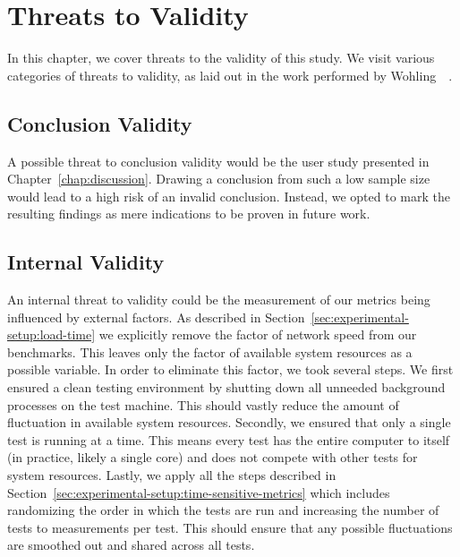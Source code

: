 \chapter{Threats to Validity}\label{chap:threats-to-validity}

In this chapter, we cover threats to the validity of this study. We visit various categories of threats to validity, as laid out in the work performed by Wohling~\etal{}~\cite{alma9939160411205131}.

\section{Conclusion Validity}
A possible threat to conclusion validity would be the user study presented in Chapter~\ref{chap:discussion}. Drawing a conclusion from such a low sample size would lead to a high risk of an invalid conclusion. Instead, we opted to mark the resulting findings as mere indications to be proven in future work.

\section{Internal Validity}
An internal threat to validity could be the measurement of our metrics being influenced by external factors. As described in Section~\ref{sec:experimental-setup:load-time} we explicitly remove the factor of network speed from our benchmarks. This leaves only the factor of available system resources as a possible variable. In order to eliminate this factor, we took several steps. We first ensured a clean testing environment by shutting down all unneeded background processes on the test machine. This should vastly reduce the amount of fluctuation in available system resources. Secondly, we ensured that only a single test is running at a time. This means every test has the entire computer to itself (in practice, likely a single core) and does not compete with other tests for system resources. Lastly, we apply all the steps described in Section~\ref{sec:experimental-setup:time-sensitive-metrics} which includes randomizing the order in which the tests are run and increasing the number of tests to \numMeasures{} measurements per test. This should ensure that any possible fluctuations are smoothed out and shared across all tests.

